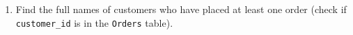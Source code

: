 \documentclass[12pt,a4paper]{article}
\begin{document}
\begin{enumerate}






    \item Find the full names of customers who have placed at least one order (check if \texttt{customer\_id} is in the \texttt{Orders} table).



\end{enumerate}
\end{document}

